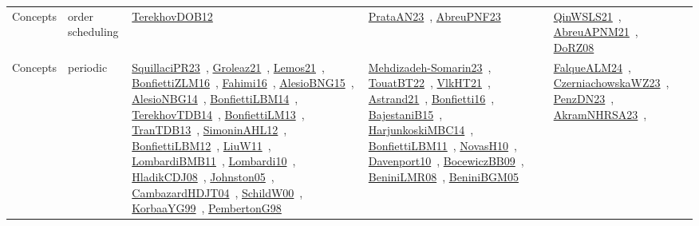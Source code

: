 {\begin{longtable}{lp{3cm}>{\raggedright\arraybackslash}p{6cm}>{\raggedright\arraybackslash}p{6cm}>{\raggedright\arraybackslash}p{8cm}}
\index{order scheduling}\index{Concepts!order scheduling}Concepts & order scheduling & \href{../works/TerekhovDOB12.pdf}{TerekhovDOB12}~\cite{TerekhovDOB12} & \href{../works/PrataAN23.pdf}{PrataAN23}~\cite{PrataAN23}, \href{../works/AbreuPNF23.pdf}{AbreuPNF23}~\cite{AbreuPNF23} & \href{../works/QinWSLS21.pdf}{QinWSLS21}~\cite{QinWSLS21}, \href{../works/AbreuAPNM21.pdf}{AbreuAPNM21}~\cite{AbreuAPNM21}, \href{../works/DoRZ08.pdf}{DoRZ08}~\cite{DoRZ08}\\
\index{periodic}\index{Concepts!periodic}Concepts & periodic & \href{../works/SquillaciPR23.pdf}{SquillaciPR23}~\cite{SquillaciPR23}, \href{../works/Groleaz21.pdf}{Groleaz21}~\cite{Groleaz21}, \href{../works/Lemos21.pdf}{Lemos21}~\cite{Lemos21}, \href{../works/BonfiettiZLM16.pdf}{BonfiettiZLM16}~\cite{BonfiettiZLM16}, \href{../works/Fahimi16.pdf}{Fahimi16}~\cite{Fahimi16}, \href{../works/AlesioBNG15.pdf}{AlesioBNG15}~\cite{AlesioBNG15}, \href{../works/AlesioNBG14.pdf}{AlesioNBG14}~\cite{AlesioNBG14}, \href{../works/BonfiettiLBM14.pdf}{BonfiettiLBM14}~\cite{BonfiettiLBM14}, \href{../works/TerekhovTDB14.pdf}{TerekhovTDB14}~\cite{TerekhovTDB14}, \href{../works/BonfiettiLM13.pdf}{BonfiettiLM13}~\cite{BonfiettiLM13}, \href{../works/TranTDB13.pdf}{TranTDB13}~\cite{TranTDB13}, \href{../works/SimoninAHL12.pdf}{SimoninAHL12}~\cite{SimoninAHL12}, \href{../works/BonfiettiLBM12.pdf}{BonfiettiLBM12}~\cite{BonfiettiLBM12}, \href{../works/LiuW11.pdf}{LiuW11}~\cite{LiuW11}, \href{../works/LombardiBMB11.pdf}{LombardiBMB11}~\cite{LombardiBMB11}, \href{../works/Lombardi10.pdf}{Lombardi10}~\cite{Lombardi10}, \href{../works/HladikCDJ08.pdf}{HladikCDJ08}~\cite{HladikCDJ08}, \href{../works/Johnston05.pdf}{Johnston05}~\cite{Johnston05}, \href{../works/CambazardHDJT04.pdf}{CambazardHDJT04}~\cite{CambazardHDJT04}, \href{../works/SchildW00.pdf}{SchildW00}~\cite{SchildW00}, \href{../works/KorbaaYG99.pdf}{KorbaaYG99}~\cite{KorbaaYG99}, \href{../works/PembertonG98.pdf}{PembertonG98}~\cite{PembertonG98} & \href{../works/Mehdizadeh-Somarin23.pdf}{Mehdizadeh-Somarin23}~\cite{Mehdizadeh-Somarin23}, \href{../works/TouatBT22.pdf}{TouatBT22}~\cite{TouatBT22}, \href{../works/VlkHT21.pdf}{VlkHT21}~\cite{VlkHT21}, \href{../works/Astrand21.pdf}{Astrand21}~\cite{Astrand21}, \href{../works/Bonfietti16.pdf}{Bonfietti16}~\cite{Bonfietti16}, \href{../works/BajestaniB15.pdf}{BajestaniB15}~\cite{BajestaniB15}, \href{../works/HarjunkoskiMBC14.pdf}{HarjunkoskiMBC14}~\cite{HarjunkoskiMBC14}, \href{../works/BonfiettiLBM11.pdf}{BonfiettiLBM11}~\cite{BonfiettiLBM11}, \href{../works/NovasH10.pdf}{NovasH10}~\cite{NovasH10}, \href{../works/Davenport10.pdf}{Davenport10}~\cite{Davenport10}, \href{../works/BocewiczBB09.pdf}{BocewiczBB09}~\cite{BocewiczBB09}, \href{../works/BeniniLMR08.pdf}{BeniniLMR08}~\cite{BeniniLMR08}, \href{../works/BeniniBGM05.pdf}{BeniniBGM05}~\cite{BeniniBGM05} & \href{../works/FalqueALM24.pdf}{FalqueALM24}~\cite{FalqueALM24}, \href{../works/CzerniachowskaWZ23.pdf}{CzerniachowskaWZ23}~\cite{CzerniachowskaWZ23}, \href{../works/PenzDN23.pdf}{PenzDN23}~\cite{PenzDN23}, \href{../works/AkramNHRSA23.pdf}{AkramNHRSA23}~\cite{AkramNHRSA23}, 
\end{longtable}}
